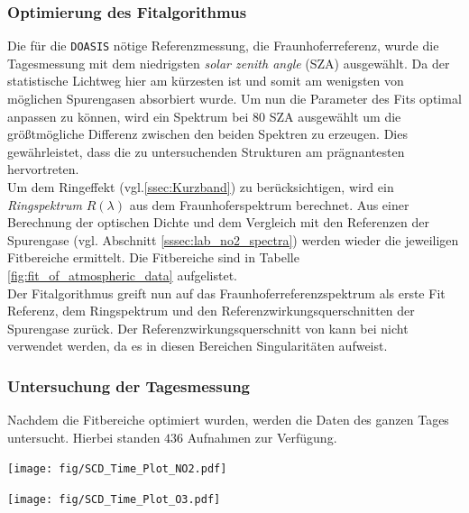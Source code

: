 \documentclass[12pt, a4paper, bibliography=totoc]{scrartcl}
\begin{document}
\begin{multicols}{2}
\subsubsection{Optimierung des Fitalgorithmus}\label{sssec:configure_fit}

Die für die \verb*+DOASIS+ nötige Referenzmessung, die Fraunhoferreferenz, wurde die Tagesmessung mit dem niedrigsten
\textit{solar zenith angle} (SZA) ausgewählt. 
Da der statistische Lichtweg hier am kürzesten ist und somit am wenigsten von möglichen Spurengasen absorbiert wurde.
Um nun die Parameter des Fits optimal anpassen zu können, wird ein Spektrum bei $80$ SZA ausgewählt um die größtmögliche Differenz zwischen den beiden Spektren zu erzeugen. 
Dies gewährleistet, dass die zu untersuchenden Strukturen am prägnantesten hervortreten. \\
Um dem Ringeffekt (vgl.\ref{ssec:Kurzband}) zu berücksichtigen, wird ein \textit{Ringspektrum} $R(\lambda)$ aus dem Fraunhoferspektrum berechnet.
Aus einer Berechnung der optischen Dichte und dem Vergleich mit den Referenzen der Spurengase (vgl. Abschnitt \ref{sssec:lab_no2_spectra}) werden wieder die jeweiligen Fitbereiche ermittelt. 
Die Fitbereiche sind in Tabelle \ref{fig:fit_of_atmospheric_data} aufgelistet.\\
Der Fitalgorithmus greift nun auf das Fraunhoferreferenzspektrum als erste Fit Referenz, dem Ringspektrum und den Referenzwirkungsquerschnitten der Spurengase zurück. 
Der Referenzwirkungsquerschnitt von  kann bei  nicht verwendet werden, da es in diesen Bereichen Singularitäten aufweist.

\subsubsection{Untersuchung der Tagesmessung}\label{sssec:tagesmessung}

Nachdem die Fitbereiche optimiert wurden, werden die Daten des ganzen Tages untersucht. 
Hierbei standen $436$ Aufnahmen zur Verfügung.


\begin{center}
	\texttt{[image: fig/SCD\_Time\_Plot\_NO2.pdf]}
	\label{fig:delta_SCD_time_NO2}
\end{center}
       
\begin{center}
	\texttt{[image: fig/SCD\_Time\_Plot\_O3.pdf]}
	\label{fig:delta_SCD_time_O3}
\end{center}       


\end{multicols}
\end{document}
